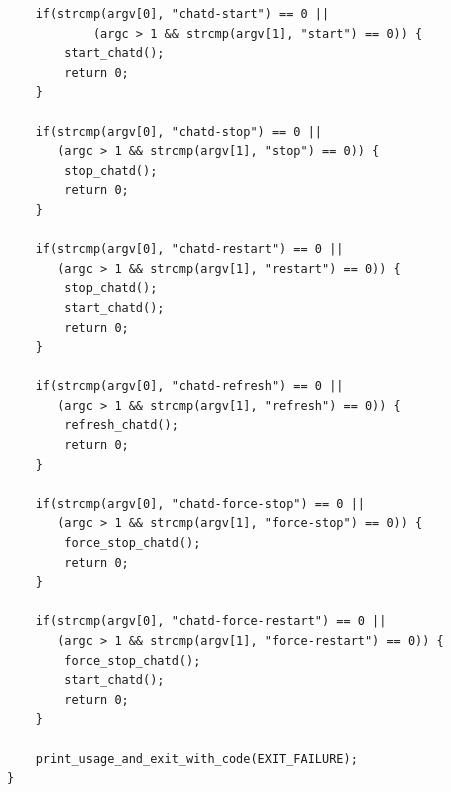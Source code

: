 \documentclass{article}
\begin{document}
\begin{verbatim}
    if(strcmp(argv[0], "chatd-start") == 0 ||
            (argc > 1 && strcmp(argv[1], "start") == 0)) {
        start_chatd();
        return 0;
    }
    
    if(strcmp(argv[0], "chatd-stop") == 0 ||
       (argc > 1 && strcmp(argv[1], "stop") == 0)) {
        stop_chatd();
        return 0;
    }
    
    if(strcmp(argv[0], "chatd-restart") == 0 ||
       (argc > 1 && strcmp(argv[1], "restart") == 0)) {
        stop_chatd();
        start_chatd();
        return 0;
    }
    
    if(strcmp(argv[0], "chatd-refresh") == 0 ||
       (argc > 1 && strcmp(argv[1], "refresh") == 0)) {
        refresh_chatd();
        return 0;
    }
    
    if(strcmp(argv[0], "chatd-force-stop") == 0 ||
       (argc > 1 && strcmp(argv[1], "force-stop") == 0)) {
        force_stop_chatd();
        return 0;
    }
    
    if(strcmp(argv[0], "chatd-force-restart") == 0 ||
       (argc > 1 && strcmp(argv[1], "force-restart") == 0)) {
        force_stop_chatd();
        start_chatd();
        return 0;
    }
    
    print_usage_and_exit_with_code(EXIT_FAILURE);
}

\end{verbatim}
\end{document}
